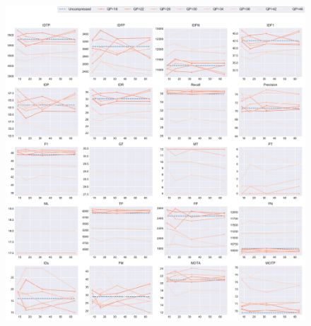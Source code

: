 \begin{figure}[!htbp]
\centering
\includegraphics[width=1.0\linewidth]{img/appendix/FourPeople_all_multiplots_msr.pdf}
\caption[Result of all object classes in Class E FourPeople with Horizontal Axis of MSR]{}
\label{fig:FourPeople_all_msr}
\end{figure}




